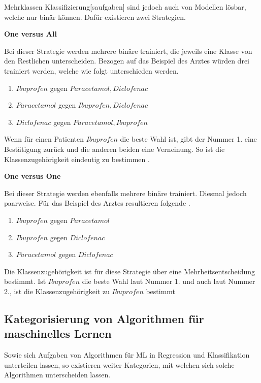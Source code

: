 \gls{Mehrklassen Klassifizierung}[saufgaben] sind jedoch auch von Modellen lösbar, welche nur binär  können. Dafür existieren zwei Strategien. 

\textbf{One versus All}\par
Bei dieser Strategie werden mehrere binäre  trainiert, die jeweils eine Klasse von den Restlichen unterscheiden. Bezogen auf das Beispiel des Arztes würden drei  trainiert werden, welche wie folgt unterschieden werden.

\begin{enumerate}
    \item \(Ibuprofen\) gegen \(Paracetamol, Diclofenac\)
    \item \(Paracetamol\) gegen \(Ibuprofen, Diclofenac\)
    \item \(Diclofenac\) gegen \(Paracetamol, Ibuprofen\)
\end{enumerate}

Wenn für einen Patienten \(Ibuprofen\) die beste Wahl ist, gibt der  Nummer 1. eine Bestätigung zurück und die anderen beiden  eine Verneinung. So ist die Klassenzugehörigkeit eindeutig zu bestimmen \cite{Bishop.2006, ShalevShwartz.2014}. \par

\textbf{One versus One}\par
Bei dieser Strategie werden ebenfalls mehrere binäre  trainiert. Diesmal jedoch paarweise. Für das Beispiel des Arztes resultieren folgende .

 \begin{enumerate}
     \item \(Ibuprofen\) gegen \(Paracetamol\)
     \item \(Ibuprofen\) gegen \(Diclofenac\)
     \item \(Paracetamol\) gegen \(Diclofenac\)
 \end{enumerate}

 Die Klassenzugehörigkeit ist für diese Strategie über eine Mehrheitsentscheidung bestimmt. Ist \(Ibuprofen\) die beste Wahl laut  Nummer 1. und auch laut  Nummer 2., ist die Klassenzugehörigkeit zu \(Ibuprofen\) bestimmt


\subsection{Kategorisierung von Algorithmen für maschinelles Lernen}
Sowie sich Aufgaben von Algorithmen für \gls{ML} in Regression und \gls{Klassifikation} unterteilen lassen, so existieren weiter Kategorien, mit welchen sich solche Algorithmen unterscheiden lassen. \par


